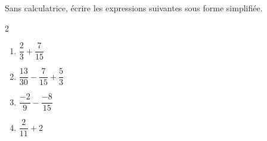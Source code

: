 \begin{exo}{}
	Sans calculatrice, écrire les expressions suivantes sous forme simplifiée.
	\vspace*{-2mm}\begin{multicols}{2}
	\begin{enumerate}[itemsep=2mm]
		\item $\dfrac{2}{3} + \dfrac{7}{15}$
		\item $\dfrac{13}{30} - \dfrac{7}{15} + \dfrac{5}{3}$
		\item $\dfrac{-2}{9} - \dfrac{-8}{15}$
		\item $\dfrac{2}{11} + 2$
	\end{enumerate}
	\end{multicols}\vspace*{-2mm}
\end{exo}
